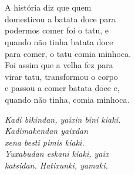 \chapter{}

A história diz que quem\\
domesticou a batata doce para\\
podermos comer foi o tatu, e\\
quando não tinha batata doce\\
para comer, o tatu comia minhoca.\\
Foi assim que a velha fez para\\
virar tatu, transformou o corpo\\
e passou a comer batata doce e,\\
quando não tinha, comia minhoca.

\textit{Kadi bikindan, yaixin bini kiaki.\\
Kadimakendan yaixdan\\
xena besti pimis kiaki.\\
Yuxabudan eskani kiaki, yaix\\
katsidan. Hatixunki, yamaki.}

